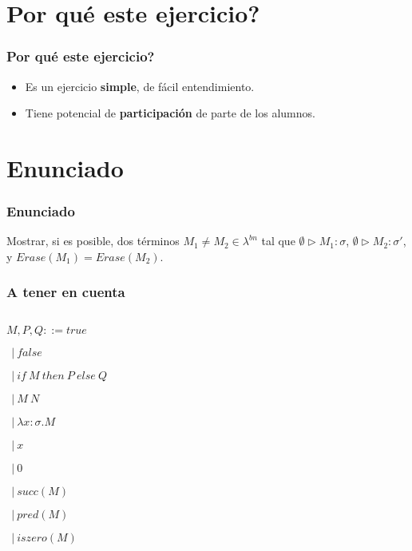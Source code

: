 \documentclass{beamer}
\begin{document}
\section{Por qué este ejercicio?}
\begin{frame}
\frametitle{Por qué este ejercicio?}
\begin{itemize}
    \item Es un ejercicio \textbf{simple},
        de fácil entendimiento.
    \item Tiene potencial de \textbf{participación}
        de parte de los alumnos.
\end{itemize}

\end{frame}

\section{Enunciado}
\begin{frame}
\frametitle{Enunciado}
Mostrar, si es posible, dos términos
$M_1 \neq M_2 \in \lambda^{bn}$ tal que
$\emptyset \triangleright M_1 : \sigma$,
$\emptyset \triangleright M_2 : \sigma'$,
y $Erase(M_1) = Erase(M_2)$.
\end{frame}

\begin{frame}
\frametitle{A tener en cuenta}

\begin{columns}

\begin{column}{0.5\textwidth}
$M, P, Q ::= true$

\qquad\qquad$\ \ |\ false$

\qquad\qquad$\ \ |\ if\ M\ then\ P\ else\ Q$

\qquad\qquad$\ \ |\ M\ N$

\qquad\qquad$\ \ |\ \lambda x : \sigma.M$

\qquad\qquad$\ \ |\ x$

\qquad\qquad$\ \ |\ 0$

\qquad\qquad$\ \ |\ succ(M)$

\qquad\qquad$\ \ |\ pred(M)$

\qquad\qquad$\ \ |\ iszero(M)$
\end{column}

\begin{column}{0.5\textwidth}
\end{column}

\end{columns}
\end{frame}
\end{document}
